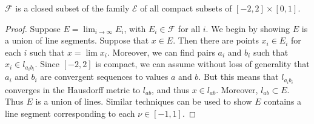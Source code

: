 \begin{lemma}
	$\mathcal{F}$ is a closed subset of the family $\mathcal{E}$ of all compact subsets of $[-2,2] \times [0,1]$.
\end{lemma}
\begin{proof}
	Suppose $E = \lim_{i \to \infty} E_i$, with $E_i \in \mathcal{F}$ for all $i$. We begin by showing $E$ is a union of line segments. Suppose that $x \in E$. Then there are points $x_i \in E_i$ for each $i$ such that $x = \lim x_i$. Moreover, we can find pairs $a_i$ and $b_i$ such that $x_i \in l_{a_ib_i}$. Since $[-2,2]$ is compact, we can assume without loss of generality that $a_i$ and $b_i$ are convergent sequences to values $a$ and $b$. But this means that $l_{a_ib_i}$ converges in the Hausdorff metric to $l_{ab}$, and thus $x \in l_{ab}$. Moreover, $l_{ab} \subset E$. Thus $E$ is a union of lines. Similar techniques can be used to show $E$ contains a line segment corresponding to each $\nu \in [-1,1]$.
 \end{proof}

